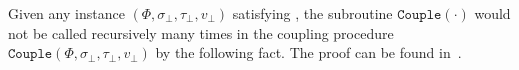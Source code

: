 \documentclass[11pt]{article}
\newtheorem{condition}{Condition}
\newcommand{\set}[1]{\left\{#1\right\}}
\def\!#1{\mathtt{#1}}
\newcommand{\vecf}{\boldsymbol{f}}
\newcommand{\qgl}[1]{{\color{purple}{#1}}}
\newcommand{\zd}[1]{{\color{green} #1}}
\begin{document}

Given any instance $\left(\Phi, \sigma_\bot, \tau_\bot,v_{\bot}\right)$ satisfying , the subroutine $\!{Couple}(\cdot)$ would not be called recursively many times in the coupling procedure $\!{Couple}(\Phi, \sigma_\bot, \tau_\bot, v_\bot)$ by the following fact. The proof can be found in~.
\end{document}
